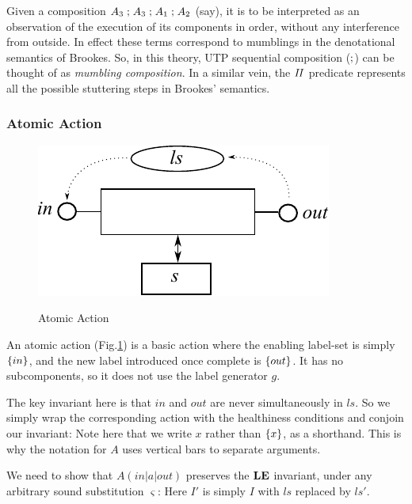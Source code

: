 Given a composition $A_3\mathrel{;} A_3\mathrel{;} A_1 \mathrel{;} A_2$ (say),
it is to be interpreted as an observation
of the execution of its components in order,
without any interference from outside.
In effect these terms correspond to mumblings in the denotational
semantics of Brookes\cite{DBLP:journals/iandc/Brookes96}.
So, in this theory,
UTP sequential composition ($\mathrel{;}$)
 can be thought of as \emph{mumbling composition}.
In a similar vein, the $\mathit{II}$ predicate represents
all the possible stuttering steps in Brookes' semantics.


\newpage
\subsubsection{Atomic Action}

\begin{figure}[h]
  \centering
  \includegraphics{images/atomic-action}\\
  \caption{Atomic Action}
  \label{fig:atomic-action}
\end{figure}

An atomic action (Fig.\ref{fig:atomic-action})
is a basic action where the enabling label-set is
simply $\{{in}\}$, and the new label introduced once complete
is $\{{out}\}$.
It has no subcomponents, so it does not use the label generator $g$.

The key invariant here is that $in$ and $out$ are never simultaneously in
$ls$. So we simply wrap the corresponding action with the healthiness
conditions and conjoin our invariant:
 Note here that we write $x$ rather than $\{{x}\}$, as a shorthand. This
is why the notation for $A$ uses vertical bars to separate arguments.

We need to show that $A(in|a|out)$ preserves the $\mathbf{LE}$
invariant, under any arbitrary sound substitution $\varsigma$:
Here $I'$ is simply $I$ with $ls$ replaced by $ls'$.

